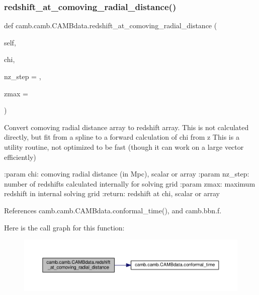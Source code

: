 \subsubsection{\texorpdfstring{redshift\+\_\+at\+\_\+comoving\+\_\+radial\+\_\+distance()}{redshift\_at\_comoving\_radial\_distance()}}
{\footnotesize\ttfamily def camb.\+camb.\+C\+A\+M\+Bdata.\+redshift\+\_\+at\+\_\+comoving\+\_\+radial\+\_\+distance (\begin{DoxyParamCaption}\item[{}]{self,  }\item[{}]{chi,  }\item[{}]{nz\+\_\+step = {},  }\item[{}]{zmax = {} }\end{DoxyParamCaption})}

\begin{DoxyVerb}Convert comoving radial distance array to redshift array.
This is not calculated directly, but fit from a spline to a forward calculation of chi from z
This is a utility routine, not optimized to be fast (though it can work on a large vector efficiently)

:param chi: comoving radial distance (in Mpc), scalar or array
:param nz_step: number of redshifts calculated internally for solving grid
:param zmax: maximum redshift in internal solving grid
:return: redshift at chi, scalar or array
\end{DoxyVerb}
 

References camb.\+camb.\+C\+A\+M\+Bdata.\+conformal\+\_\+time(), and camb.\+bbn.\+f.

Here is the call graph for this function\+:
\nopagebreak
\begin{figure}[H]
\begin{center}
\leavevmode
\includegraphics[width=350pt]{classcamb_1_1camb_1_1CAMBdata_a98a6c746b0bad46a24627c9fb384ecc6_cgraph}
\end{center}
\end{figure}
\mbox{\label{classcamb_1_1camb_1_1CAMBdata_a4cb0c3bb8e54d9ffce7774bd95972af5}} 

